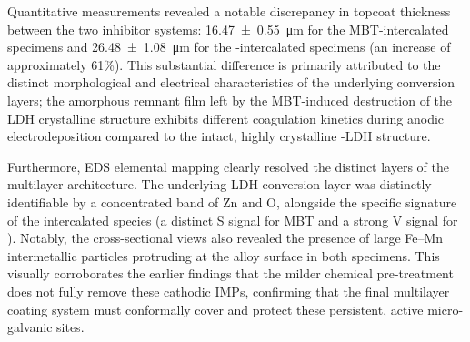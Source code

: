 \documentclass[11pt,twoside,a4paper,final]{report}
\begin{document}
Quantitative measurements revealed a notable discrepancy in topcoat thickness between the two inhibitor systems: \qty{16.47 \pm 0.55}{\micro\meter} for the MBT-intercalated specimens and \qty{26.48 \pm 1.08}{\micro\meter} for the -intercalated specimens (an increase of approximately 61\%). This substantial difference is primarily attributed to the distinct morphological and electrical characteristics of the underlying conversion layers; the amorphous remnant film left by the MBT-induced destruction of the LDH crystalline structure exhibits different coagulation kinetics during anodic electrodeposition compared to the intact, highly crystalline -LDH structure.


Furthermore, EDS elemental mapping clearly resolved the distinct layers of the multilayer architecture. The underlying LDH conversion layer was distinctly identifiable by a concentrated band of Zn and O, alongside the specific signature of the intercalated species (a distinct S signal for MBT and a strong V signal for ). Notably, the cross-sectional views also revealed the presence of large Fe--Mn intermetallic particles protruding at the alloy surface in both specimens. This visually corroborates the earlier findings that the milder chemical pre-treatment does not fully remove these cathodic IMPs, confirming that the final multilayer coating system must conformally cover and protect these persistent, active micro-galvanic sites.
\end{document}
